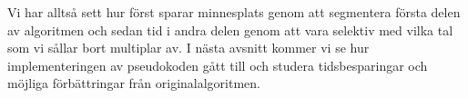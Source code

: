 Vi har alltså sett hur \cite{HaraldSieve} först sparar minnesplats genom att segmentera första delen av algoritmen och sedan tid i andra delen genom att vara selektiv med vilka tal som vi sållar bort multiplar av. I nästa avsnitt kommer vi se hur implementeringen av pseudokoden \cite{HaraldSieve} gått till och studera tidsbesparingar och möjliga förbättringar från originalalgoritmen.